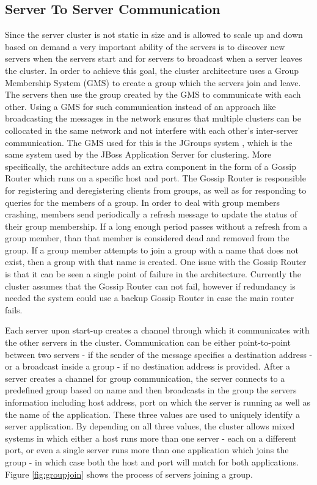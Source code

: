 \subsection{Server To Server Communication}

Since the server cluster is not static in size and is allowed to scale up and down based on demand a very important ability of the servers is to discover new servers when the servers start and for servers to broadcast when a server leaves the cluster. In order to achieve this goal, the cluster architecture uses a Group Membership System (GMS) to create a group which the servers join and leave. The servers then use the group created by the GMS to communicate with each other. Using a GMS for such communication instead of an approach like broadcasting the messages in the network ensures that multiple clusters can be collocated in the same network and not interfere with each other's inter-server communication. The GMS used for this is the JGroups system \cite{software:jgroups}, which is the same system used by the JBoss Application Server for clustering. More specifically, the architecture adds an extra component in the form of a Gossip Router which runs on a specific host and port. The Gossip Router is responsible for registering and deregistering clients from groups, as well as for responding to queries for the members of a group. In order to deal with group members crashing, members send periodically a refresh message to update the status of their group membership. If a long enough period passes without a refresh from a group member, than that member is considered dead and removed from the group. If a group member attempts to join a group with a name that does not exist, then a group with that name is created. One issue with the Gossip Router is that it can be seen a single point of failure in the architecture. Currently the cluster assumes that the Gossip Router can not fail, however if redundancy is needed the system could use a backup Gossip Router in case the main router fails.

Each server upon start-up creates a channel through which it communicates with the other servers in the cluster. Communication can be either point-to-point between two servers - if the sender of the message specifies a destination address - or a broadcast inside a group - if no destination address is provided. After a server creates a channel for group communication, the server connects to a predefined group based on name and then broadcasts in the group the servers information including host address, port on which the server is running as well as the name of the application. These three values are used to uniquely identify a server application. By depending on all three values, the cluster allows mixed systems in which either a host runs more than one server - each on a different port, or even a single server runs more than one application which joins the group - in which case both the host and port will match for both applications. Figure \ref{fig:groupjoin} shows the process of servers joining a group.


